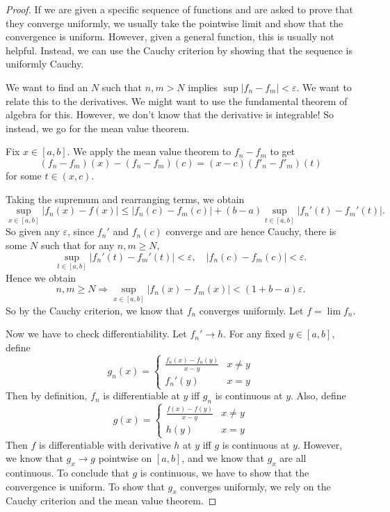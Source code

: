 \documentclass[a4paper]{article}
\begin{document}
\begin{proof}
  If we are given a specific sequence of functions and are asked to prove that they converge uniformly, we usually take the pointwise limit and show that the convergence is uniform. However, given a general function, this is usually not helpful. Instead, we can use the Cauchy criterion by showing that the sequence is uniformly Cauchy.

  We want to find an $N$ such that $n, m> N$ implies $\sup|f_n - f_m| < \varepsilon$. We want to relate this to the derivatives. We might want to use the fundamental theorem of algebra for this. However, we don't know that the derivative is integrable! So instead, we go for the mean value theorem.

  Fix $x\in [a, b]$. We apply the mean value theorem to $f_n - f_m$ to get
  \[
    (f_n - f_m)(x) - (f_n - f_m)(c) = (x - c)(f'_n - f'_m)(t)
  \]
  for some $t\in (x, c)$.

  Taking the supremum and rearranging terms, we obtain
  \[
    \sup_{x\in [a, b]}|f_n(x) - f(x)| \leq |f_n(c) - f_m(c)| + (b - a)\sup_{t\in [a, b]}|f_n'(t) - f_m'(t)|.
  \]
  So given any $\varepsilon$, since $f_n'$ and $f_n(c)$ converge and are hence Cauchy, there is some $N$ such that for any $n, m \geq N$,
  \[
    \sup_{t \in [a, b]} |f_n'(t) - f_m'(t)| < \varepsilon, \quad |f_n(c) - f_m(c)| < \varepsilon.
  \]
  Hence we obtain
  \[
    n, m \geq N \Rightarrow \sup_{x\in [a, b]}|f_n(x) - f_m(x)| < (1 + b - a) \varepsilon.
  \]
  So by the Cauchy criterion, we know that $f_n$ converges uniformly. Let $f = \lim f_n$.

  Now we have to check differentiability. Let $f_n' \to h$. For any fixed $y\in [a, b]$, define
  \[
    g_n(x) =
    \begin{cases}
      \frac{f_n(x) - f_n(y)}{x - y} & x \not= y\\
      f_n'(y) & x = y
    \end{cases}
  \]
  Then by definition, $f_n$ is differentiable at $y$ iff $g_n$ is continuous at $y$. Also, define
  \[
    g(x) =
    \begin{cases}
      \frac{f(x) - f(y)}{x - y} & x \not= y\\
      h(y) & x = y
    \end{cases}
  \]
  Then $f$ is differentiable with derivative $h$ at $y$ iff $g$ is continuous at $y$. However, we know that $g_x \to g$ pointwise on $[a, b]$, and we know that $g_x$ are all continuous. To conclude that $g$ is continuous, we have to show that the convergence is uniform. To show that $g_x$ converges uniformly, we rely on the Cauchy criterion and the mean value theorem.


\end{proof}
\end{document}

